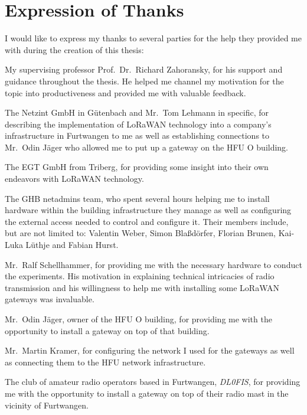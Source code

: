 
\section{Expression of Thanks}

I would like to express my thanks to several parties for the help they provided me with during the creation of this thesis:

My supervising professor Prof.\ Dr.\ Richard Zahoransky, for his support and guidance throughout the thesis.
He helped me channel my motivation for the topic into productiveness and provided me with valuable feedback.

The Netzint GmbH in Gütenbach and Mr.\ Tom Lehmann in specific, for describing the implementation of \ac{LoRaWAN} technology into a company's infrastructure in Furtwangen to me as well as establishing connections to Mr.\ Odin Jäger who allowed me to put up a gateway on the \ac{HFU} O building.

The EGT GmbH from Triberg, for providing some insight into their own endeavors with \ac{LoRaWAN} technology.

The \ac{GHB} netadmins team, who spent several hours helping me to install hardware within the building infrastructure they manage as well as configuring the external access needed to control and configure it.
Their members include, but are not limited to: Valentin Weber, Simon Blaßdörfer, Florian Brunen, Kai-Luka Lüthje and Fabian Hurst.

Mr.\ Ralf Schellhammer, for providing me with the necessary hardware to conduct the experiments.
His motivation in explaining technical intricacies of radio transmission and his willingness to help me with installing some \ac{LoRaWAN} gateways was invaluable.

Mr.\ Odin Jäger, owner of the \ac{HFU} O building, for providing me with the opportunity to install a gateway on top of that building.

Mr.\ Martin Kramer, for configuring the network I used for the gateways as well as connecting them to the \ac{HFU} network infrastructure.

The club of amateur radio operators based in Furtwangen, \emph{DL0FIS}, for providing me with the opportunity to install a gateway on top of their radio mast in the vicinity of Furtwangen.